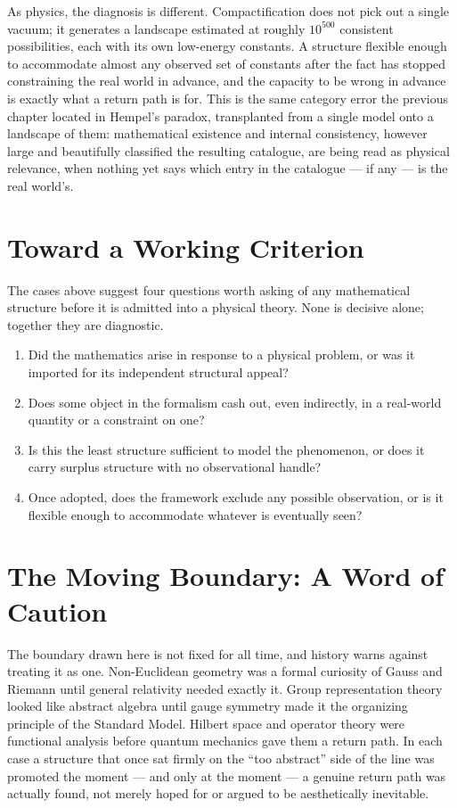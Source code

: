 \documentclass[11pt]{book}
\begin{document}
As physics, the diagnosis is different. Compactification does not pick out a single vacuum; it generates a landscape estimated at roughly $10^{500}$ consistent possibilities, each with its own low-energy constants. A structure flexible enough to accommodate almost any observed set of constants after the fact has stopped constraining the real world in advance, and the capacity to be wrong in advance is exactly what a return path is for. This is the same category error the previous chapter located in Hempel's paradox, transplanted from a single model onto a landscape of them: mathematical existence and internal consistency, however large and beautifully classified the resulting catalogue, are being read as physical relevance, when nothing yet says which entry in the catalogue --- if any --- is the real world's.

\section{Toward a Working Criterion}

The cases above suggest four questions worth asking of any mathematical structure before it is admitted into a physical theory. None is decisive alone; together they are diagnostic.

\begin{enumerate}[leftmargin=1.6cm, itemsep=4pt]
  \item[\textbf{Genesis.}] Did the mathematics arise in response to a physical problem, or was it imported for its independent structural appeal?
  \item[\textbf{Return path.}] Does some object in the formalism cash out, even indirectly, in a real-world quantity or a constraint on one?
  \item[\textbf{Minimality.}] Is this the least structure sufficient to model the phenomenon, or does it carry surplus structure with no observational handle?
  \item[\textbf{Falsifiability.}] Once adopted, does the framework exclude any possible observation, or is it flexible enough to accommodate whatever is eventually seen?
\end{enumerate}

\section{The Moving Boundary: A Word of Caution}

The boundary drawn here is not fixed for all time, and history warns against treating it as one. Non-Euclidean geometry was a formal curiosity of Gauss and Riemann until general relativity needed exactly it. Group representation theory looked like abstract algebra until gauge symmetry made it the organizing principle of the Standard Model. Hilbert space and operator theory were functional analysis before quantum mechanics gave them a return path. In each case a structure that once sat firmly on the ``too abstract'' side of the line was promoted the moment --- and only at the moment --- a genuine return path was actually found, not merely hoped for or argued to be aesthetically inevitable.
\end{document}
